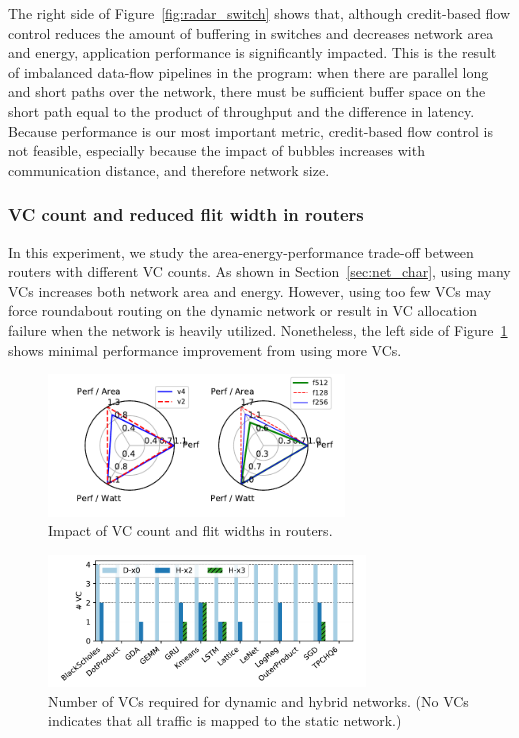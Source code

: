 The right side of Figure~\ref{fig:radar_switch} shows that, although credit-based flow control reduces the amount of buffering in switches and decreases network area and energy, application performance is significantly impacted. 
This is the result of imbalanced data-flow pipelines in the program: when there are parallel long and short paths over the network, there must be sufficient buffer space on the short path equal to the product of throughput and the difference in latency. 
Because performance is our most important metric, credit-based flow control is not feasible, especially because the impact of bubbles increases with communication distance, and therefore network size.

\subsubsection{VC count and reduced flit width in routers}
In this experiment, we study the area-energy-performance trade-off between routers with different VC counts. As shown
in Section~\ref{sec:net_char}, using many VCs increases both network area and energy.
However, using too few VCs may force roundabout routing on the dynamic network or result in VC allocation failure when the network is heavily utilized.
Nonetheless, the left side of Figure~\ref{fig:radar_router} shows minimal performance improvement from using more VCs. 
\begin{figure}
  \centering
\includegraphics[width=0.7\textwidth]{network/figs/radar_router.pdf}
  \caption{Impact of VC count and flit widths in routers.}\label{fig:radar_router}
\end{figure}

\begin{figure}
\centering
\includegraphics[width=0.75\textwidth]{network/figs/vc.pdf}
  \caption{Number of VCs required for dynamic and hybrid networks. (No VCs indicates that all traffic is mapped to the static network.)}\label{fig:vc}
\end{figure}

